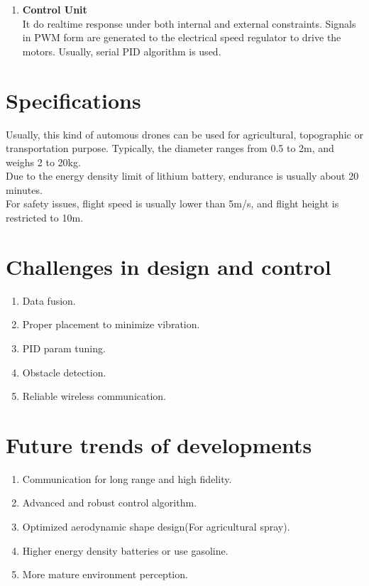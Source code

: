 \documentclass[paper=a4, fontsize=11pt]{scrartcl} %
\numberwithin{equation}{section} %
\numberwithin{figure}{section} %
\numberwithin{table}{section} %
\begin{document}
\begin{enumerate}
		\item \textbf{Control Unit}\\
			It do realtime response under both internal and external constraints. Signals in PWM form are generated to the electrical speed regulator to drive the motors. Usually, serial PID algorithm is used.
			
	\end{enumerate}

\section{Specifications}
	Usually, this kind of automous drones can be used for agricultural, topographic or transportation purpose. Typically, the diameter ranges from 0.5 to 2m, and weighs 2 to 20kg.\\
	Due to the energy density limit of lithium battery, endurance is usually about 20 minutes.\\
	For safety issues, flight speed is usually lower than 5m/s, and flight height is restricted to 10m.

\section{Challenges in design and control}
	\begin{enumerate}
		\item 
			Data fusion.
		\item 
			Proper placement to minimize vibration.
		\item 
			PID param tuning.
		\item 
			Obstacle detection.
		\item 
			Reliable wireless communication.
	\end{enumerate}

\section{Future trends of developments}
	\begin{enumerate}
		\item 
			Communication for long range and high fidelity.
		\item 
			Advanced and robust control algorithm.
		\item 
			Optimized aerodynamic shape design(For agricultural spray).
		\item 
			Higher energy density batteries or use gasoline.
		\item 
			More mature environment perception.
	\end{enumerate}
\end{document}
